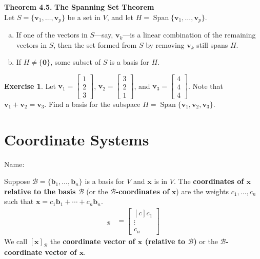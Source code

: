 \documentclass[10pt]{book}
\newcommand{\boxcolor}{gray!30}
\newenvironment{boxthm}{\begin{mdframed}[backgroundcolor=\boxcolor,nobreak=true]}{\end{mdframed}}
\newenvironment{boxdef}{\begin{mdframed}[backgroundcolor=\boxcolor,linewidth=0pt,nobreak=true]}{\end{mdframed}}
\theoremstyle{definition}
\newtheorem{exercise}{Exercise}[section]
\newcommand{\name}[1][2.5in]{\vspace{-2.3em}\hfill Name: \underline{\hspace{#1}}}
\newcommand{\B}{\mathscr{B}}
\newcommand{\vect}[1]{\ensuremath{\boldsymbol{\mathbf{#1}}}}
\DeclareMathOperator{\Span}{Span}
\newcommand{\vectset}[3][v]{\{\vect{#1}_{#2},\ldots,\vect{#1}_{#3}\}}
\newcommand{\vectsetvp}{\{\vect{v}_1,\ldots,\vect{v}_p\}}
\newcommand{\vectB}[1][x]{[\vect{#1}]_\B}
\begin{document}
\begin{boxthm}
	\textbf{Theorem 4.5.}
	\textbf{The Spanning Set Theorem} \\
	Let $S=\vectsetvp$ be a set in $V$, and let $H=\Span\vectsetvp$.
	\begin{enumerate}[a.]
		\item If one of the vectors in $S$---say, $\vect{v}_k$---is a linear combination of the remaining vectors in $S$, then the set formed from $S$ by removing $\vect{v}_k$ still spans $H$.
		\item If $H\neq\{\vect{0}\}$, some subset of $S$ is a basis for $H$.
	\end{enumerate}
\end{boxthm}
\begin{exercise} %
	Let $\vect{v}_1 = \begin{bmatrix} 1\\2\\3 \end{bmatrix}$, $\vect{v}_2 = \begin{bmatrix} 3\\2\\1 \end{bmatrix}$, and $\vect{v}_3 = \begin{bmatrix} 4\\4\\4 \end{bmatrix}$. Note that $\vect{v}_1+\vect{v}_2=\vect{v}_3$. Find a basis for the subspace $H=\Span\{\vect{v}_1,\vect{v}_2,\vect{v}_3\}$.
\end{exercise}
\vspace{1in}


\newpage


\section{Coordinate Systems}
\name

\begin{boxdef}
	Suppose $\B=\vectset[b]{1}{n}$ is a basis for $V$ and $\vect{x}$ is in $V$. The \textbf{coordinates of $\boldsymbol{\vect{x}}$ relative to the basis $\boldsymbol{\B}$} (or the $\boldsymbol{\B}$\textbf{-coordinates of} $\boldsymbol{\vect{x}}$) are the weights $c_1,\ldots,c_n$ such that $\vect{x} = c_1\vect{b}_1 + \cdots + c_n\vect{b}_n$.
	\begin{align*}
	\vectB &= \begin{bmatrix}[c]c_1 \\ \vdots \\ c_n\end{bmatrix}
	\end{align*}
	We call $\vectB$ the \textbf{coordinate vector of $\boldsymbol{\vect{x}}$ (relative to $\boldsymbol{\B}$)} or the \textbf{$\boldsymbol{\B}$-coordinate vector of $\boldsymbol{\vect{x}}$}.
\end{boxdef}
\end{document}
